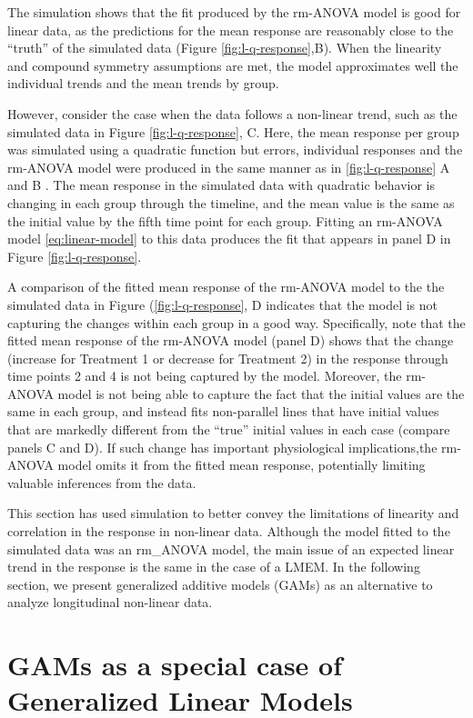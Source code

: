 \documentclass[
]{article}
\begin{document}
The simulation shows that the fit produced by the rm-ANOVA model is good for linear data, as the predictions for the mean response are reasonably close to the ``truth'' of the simulated data (Figure \ref{fig:l-q-response},B). When the linearity and compound symmetry assumptions are met, the model approximates well the individual trends and the mean trends by group.

However, consider the case when the data follows a non-linear trend, such as the simulated data in Figure \ref{fig:l-q-response}, C. Here, the mean response per group was simulated using a quadratic function but errors, individual responses and the rm-ANOVA model were produced in the same manner as in \ref{fig:l-q-response} A and B . The mean response in the simulated data with quadratic behavior is changing in each group through the timeline, and the mean value is the same as the initial value by the fifth time point for each group. Fitting an rm-ANOVA model \eqref{eq:linear-model} to this data produces the fit that appears in panel D in Figure \ref{fig:l-q-response}.

A comparison of the fitted mean response of the rm-ANOVA model to the the simulated data in Figure (\ref{fig:l-q-response}, D indicates that the model is not capturing the changes within each group in a good way. Specifically, note that the fitted mean response of the rm-ANOVA model (panel D) shows that the change (increase for Treatment 1 or decrease for Treatment 2) in the response through time points 2 and 4 is not being captured by the model. Moreover, the rm-ANOVA model is not being able to capture the fact that the initial values are the same in each group, and instead fits non-parallel lines that have initial values that are markedly different from the ``true'' initial values in each case (compare panels C and D). If such change has important physiological implications,the rm-ANOVA model omits it from the fitted mean response, potentially limiting valuable inferences from the data.

This section has used simulation to better convey the limitations of linearity and correlation in the response in non-linear data. Although the model fitted to the simulated data was an rm\_ANOVA model, the main issue of an expected linear trend in the response is the same in the case of a LMEM. In the following section, we present generalized additive models (GAMs) as an alternative to analyze longitudinal non-linear data.

\hypertarget{gams-as-a-special-case-of-generalized-linear-models}{%
\section{GAMs as a special case of Generalized Linear Models}\label{gams-as-a-special-case-of-generalized-linear-models}}
\end{document}
